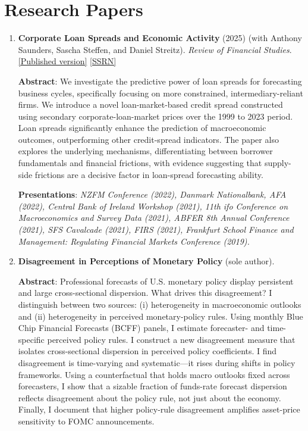 \documentclass[11pt,a4paper]{article}
\begin{document}
\section{Research Papers}

\begin{enumerate}
\item \textbf{Corporate Loan Spreads and Economic Activity} (2025) (with Anthony Saunders, Sascha Steffen, and Daniel Streitz). \textit{Review of Financial Studies}. \href{https://academic.oup.com/rfs/article/38/2/507/7918340?guestAccessKey=478e97d8-0d2f-481e-bb53-7669945bba3a}{[Published version]} \href{https://papers.ssrn.com/sol3/papers.cfm?abstract_id=3717358}{[SSRN]}

\textbf{Abstract}: We investigate the predictive power of loan spreads for forecasting business cycles, specifically focusing on more constrained, intermediary-reliant firms. We introduce a novel loan-market-based credit spread constructed using secondary corporate-loan-market prices over the 1999 to 2023 period. Loan spreads significantly enhance the prediction of macroeconomic outcomes, outperforming other credit-spread indicators. The paper also explores the underlying mechanisms, differentiating between borrower fundamentals and financial frictions, with evidence suggesting that supply-side frictions are a decisive factor in loan-spread forecasting ability.

\textbf{Presentations}: \textit{NZFM Conference (2022), Danmark Nationalbank, AFA (2022), Central Bank of Ireland Workshop (2021), 11th ifo Conference on Macroeconomics and Survey Data (2021), ABFER 8th Annual Conference (2021), SFS Cavalcade (2021), FIRS (2021), Frankfurt School Finance and Management: Regulating Financial Markets Conference (2019).}

\item \textbf{Disagreement in Perceptions of Monetary Policy} (sole author).

\textbf{Abstract}: Professional forecasts of U.S. monetary policy display persistent and large cross-sectional dispersion. What drives this disagreement? I distinguish between two sources: (i) heterogeneity in macroeconomic outlooks and (ii) heterogeneity in perceived monetary-policy rules. Using monthly Blue Chip Financial Forecasts (BCFF) panels, I estimate forecaster- and time-specific perceived policy rules. I construct a new disagreement measure that isolates cross-sectional dispersion in perceived policy coefficients. I find disagreement is time-varying and systematic---it rises during shifts in policy frameworks. Using a counterfactual that holds macro outlooks fixed across forecasters, I show that a sizable fraction of funds-rate forecast dispersion reflects disagreement about the policy rule, not just about the economy. Finally, I document that higher policy-rule disagreement amplifies asset-price sensitivity to FOMC announcements.


\end{enumerate}
\end{document}
